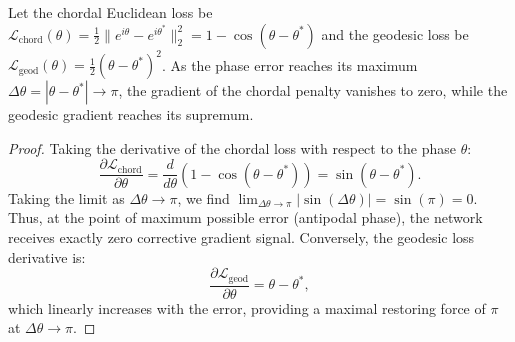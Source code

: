 \begin{proposition}
\label{prop:vanishing_gradient}
Let the chordal Euclidean loss be $\mathcal{L}_{\mathrm{chord}}(\theta) = \frac{1}{2}\|e^{i\theta} - e^{i\theta^*}\|_2^2 = 1 - \cos(\theta - \theta^*)$ and the geodesic loss be $\mathcal{L}_{\mathrm{geod}}(\theta) = \frac{1}{2}(\theta - \theta^*)^2$. As the phase error reaches its maximum $\Delta\theta = |\theta - \theta^*| \to \pi$, the gradient of the chordal penalty vanishes to zero, while the geodesic gradient reaches its supremum.
\end{proposition}
\begin{proof}
Taking the derivative of the chordal loss with respect to the phase $\theta$:
\begin{equation}
    \frac{\partial \mathcal{L}_{\mathrm{chord}}}{\partial \theta} = \frac{d}{d\theta} (1 - \cos(\theta - \theta^*)) = \sin(\theta - \theta^*).
\end{equation}
Taking the limit as $\Delta\theta \to \pi$, we find $\lim_{\Delta\theta \to \pi} |\sin(\Delta\theta)| = \sin(\pi) = 0$. Thus, at the point of maximum possible error (antipodal phase), the network receives exactly zero corrective gradient signal.
Conversely, the geodesic loss derivative is:
\begin{equation}
    \frac{\partial \mathcal{L}_{\mathrm{geod}}}{\partial \theta} = \theta - \theta^*,
\end{equation}
which linearly increases with the error, providing a maximal restoring force of $\pi$ at $\Delta\theta \to \pi$.
\end{proof}

